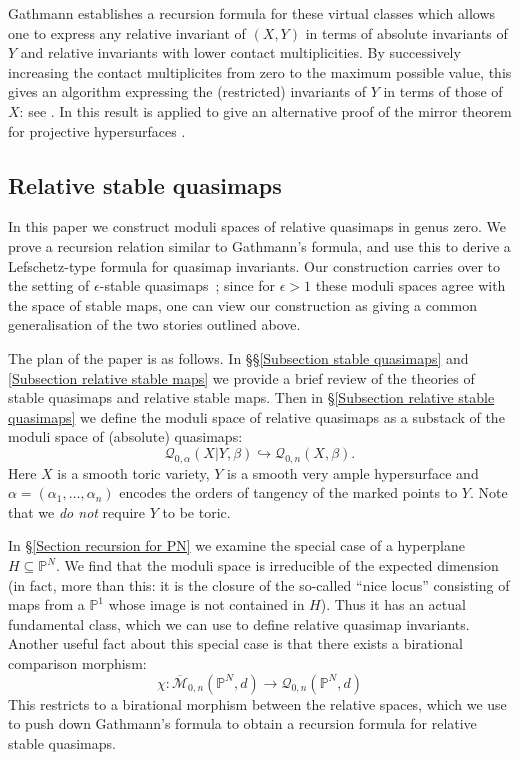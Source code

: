 \documentclass[11pt]{amsart}
\newcommand{\M}[4]{\overline{\mathcal{M}}_{#1,#2}(#3,#4)}
\newcommand{\Q}[4]{\mathcal{Q}_{#1,#2}(#3,#4)}
\newcommand{\PP}{\mathbb P}
\renewcommand{\to}{\rightarrow}
\newcommand{\comp}{\chi}
\theoremstyle{definition}
\theoremstyle{definition}
\begin{document}
Gathmann establishes a recursion formula for these virtual classes which allows one to express any relative invariant of $(X,Y)$ in terms of absolute invariants of $Y$ and relative invariants with lower contact multiplicities. 
By successively increasing the contact multiplicites from zero to the maximum possible value, this gives an algorithm expressing the (restricted) invariants of $Y$ in terms of those of $X$: see \cite[Corollary 5.7]{Ga}. In \cite{Ga-MF} this result is applied to give an alternative proof of the mirror theorem for projective hypersurfaces \cite{Givental-equivariantGW} \cite{LLY1}.

\subsection{Relative stable quasimaps}
In this paper we construct moduli spaces of relative quasimaps in genus zero. We prove a recursion relation similar to Gathmann's formula, and use this to derive a Lefschetz-type formula for quasimap invariants.
Our construction carries over to the setting of $\epsilon$-stable quasimaps~\cite{CF-K}; since for $\epsilon > 1$ these moduli spaces agree with the space of stable maps, one can view our construction as giving a common generalisation of the two stories outlined above.

The plan of the paper is as follows. In \S\S \ref{Subsection stable quasimaps} and \ref{Subsection relative stable maps} we provide a brief review of the theories of stable quasimaps and relative stable maps. Then in \S \ref{Subsection relative stable quasimaps} we define the moduli space of relative quasimaps as a substack of the moduli space of (absolute) quasimaps:
\begin{equation*} \Q{0}{\alpha}{X|Y}{\beta} \hookrightarrow \Q{0}{n}{X}{\beta}. \end{equation*}
Here $X$ is a smooth toric variety, $Y$ is a smooth very ample hypersurface and $\alpha = (\alpha_1, \ldots, \alpha_n)$ encodes the orders of tangency of the marked points to $Y$. Note that we \emph{do not} require $Y$ to be toric.

In \S \ref{Section recursion for PN} we examine the special case of a hyperplane $H \subseteq \PP^N$. We find that the moduli space is irreducible of the expected dimension (in fact, more than this: it is the closure of the so-called ``nice locus'' consisting of maps from a $\PP^1$ whose image is not contained in $H$). Thus it has an actual fundamental class, which we can use to define relative quasimap invariants.
Another useful fact about this special case is that there exists a birational comparison morphism:
\begin{equation*} \comp : \M{0}{n}{\PP^N}{d} \to \Q{0}{n}{\PP^N}{d} \end{equation*} 
This restricts to a birational morphism between the relative spaces, which we use to push down Gathmann's formula to obtain a recursion formula for relative stable quasimaps.
\end{document}
